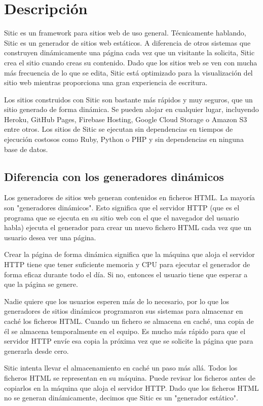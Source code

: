 \section{Descripción}

Sitic es un framework para sitios web de uso general. Técnicamente hablando, Sitic es un generador de sitios web estáticos.
A diferencia de otros sistemas que construyen dinámicamente una página cada vez que un visitante la solicita, Sitic crea el sitio
cuando creas su contenido. Dado que los sitios web se ven con mucha más frecuencia de lo que se edita,
Sitic está optimizado para la visualización del sitio web mientras proporciona una gran experiencia de escritura.

Los sitios construidos con Sitic son bastante más rápidos y muy seguros, que un sitio generado de forma dinámica.
Se pueden alojar en cualquier lugar, incluyendo Heroku, GitHub Pages, Firebase Hosting, Google Cloud Storage o Amazon
S3 entre otros. Los sitios de Sitic se ejecutan sin dependencias en tiempos de ejecución costosos como Ruby, Python
o PHP y sin dependencias en ninguna base de datos.

\subsection{Diferencia con los generadores dinámicos}

Los generadores de sitios web generan contenidos en ficheros HTML. La mayoría son "generadores dinámicos".
Esto significa que el servidor HTTP (que es el programa que se ejecuta en su sitio web con el que el navegador del
usuario habla) ejecuta el generador para crear un nuevo fichero HTML cada vez que un usuario desea ver una página.

Crear la página de forma dinámica significa que la máquina que aloja el servidor HTTP tiene que tener suficiente
memoria y CPU para ejecutar el generador de forma eficaz durante todo el día. Si no, entonces el usuario tiene que
esperar a que la página se genere.

Nadie quiere que los usuarios esperen más de lo necesario, por lo que los generadores de sitios dinámicos programaron
sus sistemas para almacenar en caché los ficheros HTML. Cuando un fichero se almacena en caché, una copia de él se
almacena temporalmente en el equipo. Es mucho más rápido para que el servidor HTTP envíe esa copia la próxima vez que
se solicite la página que para generarla desde cero.

Sitic intenta llevar el almacenamiento en caché un paso más allá. Todos los ficheros HTML se representan en su máquina.
Puede revisar los ficheros antes de copiarlos en la máquina que aloja el servidor HTTP. Dado que los ficheros HTML
no se generan dinámicamente, decimos que Sitic es un "generador estático".

